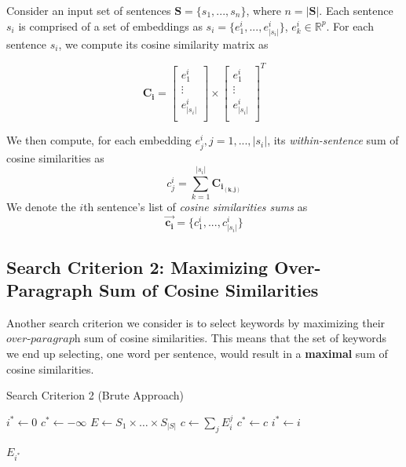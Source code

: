 \documentclass[12pt]{article}
\begin{document}
Consider an input set of sentences $\bm{S} = \{s_1, ..., s_n\}$, where $n = |\bm{S}|$. Each sentence $s_i$ is comprised of a set of embeddings as $s_i = \{e^{i}_{1}, ..., e^{i}_{|s_i|}\}$,  $e^{i}_{k} \in \mathbb{R}^{p}$. For each sentence $s_i$, we compute its cosine similarity matrix as

\[\bm{C_i} = \begin{bmatrix}
         e^{i}_{1} \\
         \vdots \\
         e^{i}_{|s_i|} \\
        \end{bmatrix} \times  \begin{bmatrix}
         e^{i}_{1} \\
         \vdots \\
         e^{i}_{|s_i|} \\
        \end{bmatrix}^{T}\]

We then compute, for each embedding $e^{i}_{j}, j = 1,...,|s_i|$, its \textit{within-sentence} sum of cosine similarities as
\[ c^{i}_{j} = \sum^{|s_i|}_{k=1} \bm{C_{i{_{(k,j)}}}}\]
We denote the $i$th sentence's list of \textit{cosine similarities sums} as
\[\bm{\vec{c_i}} = \{ c^{i}_{1}, ...,  c^{i}_{|s_i|}\}\]


\subsection{Search Criterion 2: Maximizing Over-Paragraph Sum of Cosine Similarities}
Another search criterion we consider is to select keywords by maximizing their $\textit{over-paragraph}$ sum of cosine similarities. This means that the set of keywords we end up selecting, one word per sentence, would result in a \textbf{maximal} sum of cosine similarities.

\begin{algorithm}[H]
\caption{Search Criterion 2 (Brute Approach)}\label{euclid}
\begin{algorithmic}[1]
\State $i^{*} \gets 0 $
\State $c^{*} \gets -\infty$
\State $E \gets S_{1} \times \dots \times S_{|S|}$
\State$c \gets  \sum\limits_{j} E_{i}^{j}$
\State $c^{*} \gets c$
\State$ i^{*} \gets i$

\EndIf
\EndFor
\State \Return $E_{i^{*}}$
\EndProcedure
\end{algorithmic}
\end{algorithm}
\end{document}

